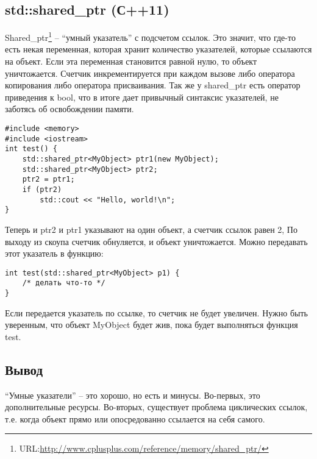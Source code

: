 \subsection{std::shared\_ptr (С++11)}

Shared\_ptr\footnote{URL:\url{http://www.cplusplus.com/reference/memory/shared_ptr/}} -- ``умный указатель'' с подсчетом ссылок. Это значит, что где-то есть некая переменная, которая хранит количество указателей, которые ссылаются на объект. Если эта переменная становится равной нулю, то объект уничтожается. Счетчик инкрементируется при каждом вызове либо оператора копирования либо оператора присваивания. Так же у shared\_ptr есть оператор приведения к bool, что в итоге дает привычный синтаксис указателей, не заботясь об освобождении памяти.
\begin{lstlisting}
#include <memory> 
#include <iostream>
int test() {
    std::shared_ptr<MyObject> ptr1(new MyObject);
    std::shared_ptr<MyObject> ptr2;    
    ptr2 = ptr1;    
    if (ptr2)
        std::cout << "Hello, world!\n";
}
\end{lstlisting}

Теперь и ptr2 и ptr1 указывают на один объект, а счетчик ссылок равен 2, По выходу из скоупа счетчик обнуляется, и объект уничтожается. Можно передавать этот указатель в функцию:
\begin{lstlisting}
int test(std::shared_ptr<MyObject> p1) {
    /* делать что-то */
}
\end{lstlisting}

Если передается указатель по ссылке, то счетчик не будет увеличен. Нужно быть уверенным, что объект MyObject будет жив, пока будет выполняться функция test.
\subsection{Вывод}
``Умные указатели'' -- это хорошо, но есть и минусы. 
Во-первых, это дополнительные ресурсы.
Во-вторых, существует проблема циклических ссылок, т.е. когда объект прямо или опосредованно ссылается на себя самого.
